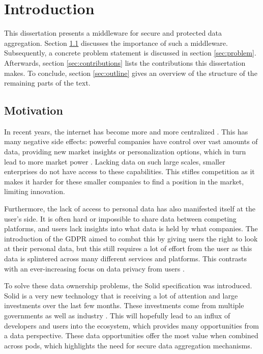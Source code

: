 \chapter{Introduction}
\label{cha:intro}

This dissertation presents a middleware for secure and protected data aggregation. Section \ref{sec:motivation} discusses the importance of such a middleware. Subsequently, a concrete problem statement is discussed in section \ref{sec:problem}. Afterwards, section \ref{sec:contributions} lists the contributions this dissertation makes. To conclude, section \ref{sec:outline} gives an overview of the structure of the remaining parts of the text.

\section{Motivation}
\label{sec:motivation}
In recent years, the internet has become more and more centralized \citep{internet-report}. This has many negative side effects: powerful companies have control over vast amounts of data, providing new market insights or personalization options, which in turn lead to more market power \citep{big-tech-innovation, platform-monopolies}. Lacking data on such large scales, smaller enterprises do not have access to these capabilities. This stifles competition as it makes it harder for these smaller companies to find a position in the market, limiting innovation. 

Furthermore, the lack of access to personal data has also manifested itself at the user's side. It is often hard or impossible to share data between competing platforms, and users lack insights into what data is held by what companies. The introduction of the \gls{GDPR} \citep{GDPR} aimed to combat this by giving users the right to look at their personal data, but this still requires a lot of effort from the user as this data is splintered across many different services and platforms. This contrasts with an ever-increasing focus on data privacy from users .

To solve these data ownership problems, the Solid \citep{solid} specification was introduced. Solid is a very new technology that is receiving a lot of attention and large investments over the last few months. These investments come from multiple governments  as well as industry . This will hopefully lead to an influx of developers and users into the ecosystem, which provides many opportunities from a data perspective. These data opportunities offer the most value when combined across pods, which highlights the need for secure data aggregation mechanisms.

